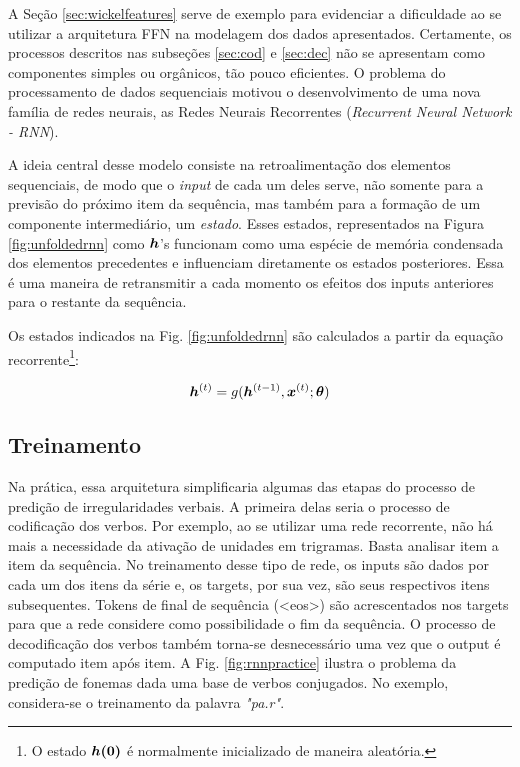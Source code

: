 A Seção \ref{sec:wickelfeatures} serve de exemplo para evidenciar a dificuldade ao se utilizar a arquitetura FFN na modelagem dos dados apresentados. Certamente, os processos descritos nas subseções \ref{sec:cod} e \ref{sec:dec} não se apresentam como componentes simples ou orgânicos, tão pouco eficientes. O problema do processamento de dados sequenciais motivou o desenvolvimento de uma nova família de redes neurais, as Redes Neurais Recorrentes (\textit{Recurrent Neural Network - RNN}). 

A ideia central desse modelo consiste na retroalimentação dos elementos sequenciais, de modo que o \textit{input} de cada um deles serve, não somente para a previsão do próximo item da sequência, mas também para a formação de um componente intermediário, um \textit{estado}. Esses estados, representados na Figura \ref{fig:unfoldedrnn} como $\bm{h}$'s funcionam como uma espécie de memória condensada dos elementos precedentes e influenciam diretamente os estados posteriores. Essa é uma maneira de retransmitir a cada momento os efeitos dos inputs anteriores para o restante da sequência.

%


Os estados indicados na Fig. \ref{fig:unfoldedrnn} são calculados a partir da equação recorrente\footnote{O estado $\bm{h(0)}$ é normalmente inicializado de maneira aleatória.}:

\begin{equation}
\bm{h}^{(t)} = g(\bm{h}^{(t-1)}, \bm{x}^{(t)}; \bm{\theta})
\label{eq:rnn}
\end{equation}

\subsection{Treinamento}

Na prática, essa arquitetura simplificaria algumas das etapas do processo de predição de irregularidades verbais. A primeira delas seria o processo de codificação dos verbos. Por exemplo, ao se utilizar uma rede recorrente, não há mais a necessidade da ativação de unidades em trigramas. Basta analisar item a item da sequência. No treinamento desse tipo de rede, os inputs são dados por cada um dos itens da série e, os targets, por sua vez, são seus respectivos itens subsequentes. Tokens de final de sequência (<eos>) são acrescentados nos targets para que a rede considere como possibilidade o fim da sequência. O processo de decodificação dos verbos também torna-se desnecessário uma vez que o output é computado item após item. A Fig. \ref{fig:rnnpractice} ilustra o problema da predição de fonemas dada uma base de verbos conjugados. No exemplo, considera-se o treinamento da palavra \textit{"pa.r\textupsilon"}. 

